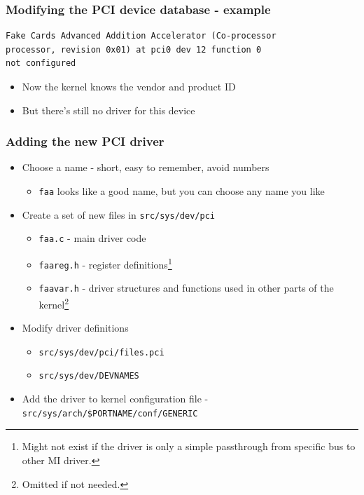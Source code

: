 \documentclass[dvipsnames,table]{beamer}
\begin{document}
\begin{frame}[fragile]
\frametitle{Modifying the PCI device database - example}
\begin{verbatim}
Fake Cards Advanced Addition Accelerator (Co-processor 
processor, revision 0x01) at pci0 dev 12 function 0 
not configured
\end{verbatim}
\begin{itemize}
	\item Now the kernel knows the vendor and product ID
	\item But there's still no driver for this device
\end{itemize}
\end{frame}

\begin{frame}
\frametitle{Adding the new PCI driver}
\begin{itemize}
	\item Choose a name - short, easy to remember, avoid numbers
	\begin{itemize}
		\item {\tt faa} looks like a good name, but you can choose any name you like
	\end{itemize}
	\item Create a set of new files in {\tt src/sys/dev/pci}
	\begin{itemize}
		\item {\tt faa.c} - main driver code
		\item {\tt faareg.h} - register definitions\footnote{Might not exist if the driver is only a simple passthrough from specific bus to other MI driver.}
		\item {\tt faavar.h} - driver structures and functions used in other parts of the kernel\footnote{Omitted if not needed.}
	\end{itemize}
	\item Modify driver definitions
	\begin{itemize}
		\item {\tt src/sys/dev/pci/files.pci}
		\item {\tt src/sys/dev/DEVNAMES}
	\end{itemize}
	\item Add the driver to kernel configuration file - {\tt src/sys/arch/\$PORTNAME/conf/GENERIC}
\end{itemize}
\end{frame}
\end{document}

